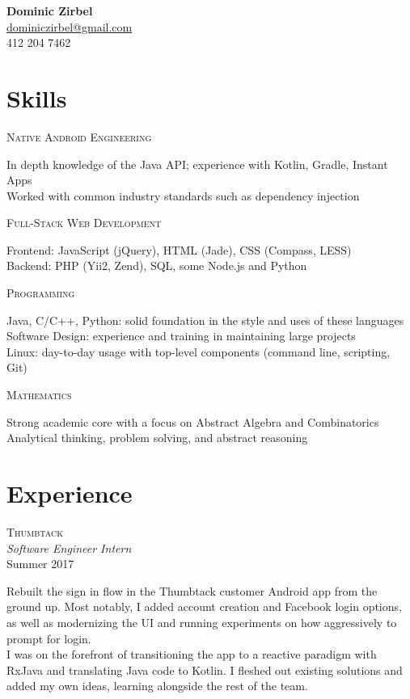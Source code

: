 \documentclass[letterpaper,10pt]{article}
\newenvironment{resumecols1}[1]
{
    \vspace{.075cm}
    \begin{minipage}[t]{.22\textwidth}
        \begin{flushright}
            \textsc{#1}
        \end{flushright}
    \end{minipage}
    \hspace{.005\textwidth}
    \begin{minipage}[t]{.7625\textwidth}
        \begin{flushleft}
}
{
        \end{flushleft}
    \end{minipage}
    \vspace{.075cm}
}
\newenvironment{resumecols}[3]
{
    \vspace{.075cm}
    \begin{minipage}[t]{.22\textwidth}
        \begin{flushright}
            \textsc{#1} \\
            \small{\textit{#2}} \\
            \small{#3}
        \end{flushright}
    \end{minipage}
    \hspace{.005\textwidth}
    \begin{minipage}[t]{.7625\textwidth}
        \begin{flushleft}
}
{
        \end{flushleft}
    \end{minipage}
    \vspace{.075cm}
}
\begin{document}
\begin{flushright}
    \textbf{\large{Dominic Zirbel}} \\
    \href{mailto:dominiczirbel@gmail.com}{dominiczirbel@gmail.com} \\
    412 204 7462
\end{flushright}

\section{Skills}

\begin{resumecols1}{Native Android Engineering}
    In depth knowledge of the Java API; experience with Kotlin, Gradle, Instant Apps \\
    Worked with common industry standards such as dependency injection
\end{resumecols1}

\begin{resumecols1}{Full-Stack Web Development}
    Frontend: JavaScript (jQuery), HTML (Jade), CSS (Compass, LESS) \\
    Backend: PHP (Yii2, Zend), SQL, some Node.js and Python
\end{resumecols1}

\begin{resumecols1}{Programming}
    Java, C/C++, Python: solid foundation in the style and uses of these languages \\
    Software Design: experience and training in maintaining large projects \\
    Linux: day-to-day usage with top-level components (command line, scripting, Git)
\end{resumecols1}

\begin{resumecols1}{Mathematics}
    Strong academic core with a focus on Abstract Algebra and Combinatorics \\
    Analytical thinking, problem solving, and abstract reasoning \\
\end{resumecols1}

\section{Experience}

\begin{resumecols}{Thumbtack}{Software Engineer Intern}{Summer 2017}
    Rebuilt the sign in flow in the Thumbtack customer Android app from the ground up. Most notably, I added account creation and Facebook login options, as well as modernizing the UI and running experiments on how aggressively to prompt for login. \\
    \vspace{4pt}
    I was on the forefront of transitioning the app to a reactive paradigm with RxJava and translating Java code to Kotlin. I fleshed out existing solutions and added my own ideas, learning alongside the rest of the team. \\
\end{resumecols}
\end{document}
